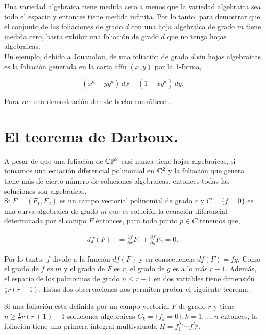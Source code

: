 Una variedad algebraica tiene medida cero a menos que la variedad algebraica sea todo el espacio y entonces tiene medida infinita. Por lo tanto, para demostrar que  el conjunto de las foliaciones de grado $d$ con una hoja algebraica de grado $m$ tiene medida cero, basta exhibir una foliación de grado $d$ que no tenga hojas algebraicas.\\

Un ejemplo, debido a Jouanolou, de una foliación de grado $d$ sin hojas algebraicas es la foliación generada en la carta afín $(x,y)$ por la 1-forma,

$$(x^{d}-yy^{d})\, dx-(1-xy^{d})\, dy.$$

Para ver una demostración de este hecho consúltese \cite{IlyaYako}.


\section{El teorema de Darboux.} 

A pesar de que una foliación de $\mathbb{C}\mathbb{P}^2$ casi nunca tiene hojas algebraicas, si tomamos una ecuación diferencial polinomial en $\mathbb{C}^{2}$ y la foliación que genera tiene más de cierto número de soluciones algebraicas, entonces todas las soluciones son algebraicas.\\

Si $F=(F_{1},F_{2})$ es un campo vectorial polinomial de grado $r$ y $C=\{f=0\}$ es una curva algebraica de grado $m$ que es solución la ecuación diferencial determinada por el campo $F$ entonces, para todo punto $p\in C$ tenemos que,

\begin{align}
df(F) &=\frac{\partial f}{\partial x}F_{1}+\frac{\partial f}{\partial y}F_{2}=0.
\end{align}

\noindent Por lo tanto, $f$ divide a la función $df(F)$ y en consecuencia $df(F)=fg$. Como el grado de $f$ es $m$ y el grado de $F$ es $r$, el grado de $g$ es a lo más $r-1$. Además, el espacio de los polinomios de grado $n\leq r-1$ en dos variables tiene dimensión $\frac{1}{2}r(r+1)$. Estas dos observaciones nos permiten probar el siguiente teorema.

\begin{Teorema}
\label{Teo:AnteDarboux}
Si una foliación esta definida por un campo vectorial $F$ de grado $r$ y tiene $n\geq \frac{1}{2}r(r+1)+1$ soluciones algebraicas $C_{k}=\{f_{k}=0\}, k=1,\ldots,n$ entonces, la foliación tiene una primera integral multivaluada $H=f_{1}^{\lambda_{1}}\cdots f_{n}^{\lambda_{n}}$.
\end{Teorema}

